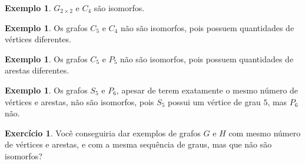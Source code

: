 \documentclass[12pt, a4paper]{article}
\theoremstyle{definition}
\newtheorem{exem}[teor]{Exemplo}
\newtheorem{exer}{Exercício}
\begin{document}
\begin{exem}
$G_{2\times 2}$ e $C_4$ são isomorfos.
\end{exem}

\begin{exem}
Os grafos $C_5$ e $C_4$ não são isomorfos, pois possuem quantidades de vértices diferentes.
\end{exem}

\begin{exem}
Os grafos $C_5$ e $P_5$ não são isomorfos, pois possuem quantidades de arestas diferentes.
\end{exem}

\begin{exem}
Os grafos $S_5$ e $P_6$, apesar de terem exatamente o mesmo número de vértices e arestas, não são isomorfos, pois $S_5$ possui um vértice de grau $5$, mas $P_6$ não.
\end{exem}

\begin{exer}
Você conseguiria dar exemplos de grafos $G$ e $H$ com mesmo número de vértices e arestas, e com a mesma sequência de graus, mas que não são isomorfos?
\end{exer}
\end{document}
